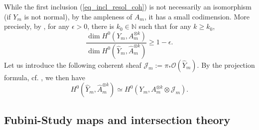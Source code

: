 \documentclass[12pt]{article}
\numberwithin{equation}{section}
\theoremstyle{theorem}
\theoremstyle{definition}
\theoremstyle{remark}
\newcommand{\nat}{\mathbb{N}}
\begin{document}
	While the first inclusion (\ref{eq_incl_resol_coh}) is not necessarily an isomorphism (if $Y_m$ is not normal), by the ampleness of $A_m$, it has a small codimension.
	More precisely, by \cite[proof of Lemma 2.2.3]{LazarBookI}, for any $\epsilon > 0$, there is $k_0 \in \nat$ such that for any $k \geq k_0$,
	\begin{equation}\label{eq_h0ym_yhatm}
		\frac{\dim H^0(Y_m, A_m^{\otimes k})}{\dim H^0(\widehat{Y}_m, \widehat{A}_m^{\otimes k})}
		\geq 
		1 - \epsilon.
	\end{equation}
	Let us introduce the following coherent sheaf $\mathcal{J}_m := \pi_* \mathscr{O}(\widehat{Y}_m)$.
	By the projection formula, cf. \cite[p. 140]{LazarBookI}, we then have
	\begin{equation}\label{eq_isom_sheaf}
		H^0(\widehat{Y}_m, \widehat{A}_m^{\otimes k})
		\simeq
		H^0(Y_m, A_m^{\otimes k} \otimes \mathcal{J}_m).
	\end{equation}
	
	\subsection{Fubini-Study maps and intersection theory}\label{sect_fs_inter}
	
\end{document}
